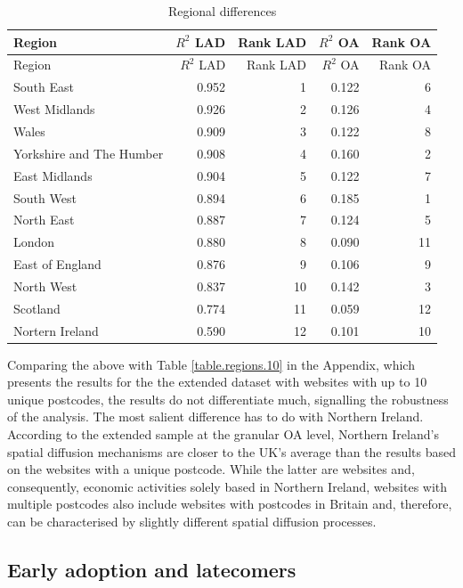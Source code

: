 \documentclass[
  authoryear,
  preprint,
  3p]{elsarticle}
\begin{document}
\begin{longtable}[]{@{}lrrrr@{}}
\caption{Regional differences\label{table.regions}}\tabularnewline
\toprule\noalign{}
Region & \(R^2\) LAD & Rank LAD & \(R^2\) OA & Rank OA \\
\midrule\noalign{}
\endfirsthead
\toprule\noalign{}
Region & \(R^2\) LAD & Rank LAD & \(R^2\) OA & Rank OA \\
\midrule\noalign{}
\endhead
\bottomrule\noalign{}
\endlastfoot
South East & 0.952 & 1 & 0.122 & 6 \\
West Midlands & 0.926 & 2 & 0.126 & 4 \\
Wales & 0.909 & 3 & 0.122 & 8 \\
Yorkshire and The Humber & 0.908 & 4 & 0.160 & 2 \\
East Midlands & 0.904 & 5 & 0.122 & 7 \\
South West & 0.894 & 6 & 0.185 & 1 \\
North East & 0.887 & 7 & 0.124 & 5 \\
London & 0.880 & 8 & 0.090 & 11 \\
East of England & 0.876 & 9 & 0.106 & 9 \\
North West & 0.837 & 10 & 0.142 & 3 \\
Scotland & 0.774 & 11 & 0.059 & 12 \\
Nortern Ireland & 0.590 & 12 & 0.101 & 10 \\
\end{longtable}

Comparing the above with Table \ref{table.regions.10} in the Appendix,
which presents the results for the the extended dataset with websites
with up to 10 unique postcodes, the results do not differentiate much,
signalling the robustness of the analysis. The most salient difference
has to do with Northern Ireland. According to the extended sample at the
granular OA level, Northern Ireland's spatial diffusion mechanisms are
closer to the UK's average than the results based on the websites with a
unique postcode. While the latter are websites and, consequently,
economic activities solely based in Northern Ireland, websites with
multiple postcodes also include websites with postcodes in Britain and,
therefore, can be characterised by slightly different spatial diffusion
processes.

\subsection{Early adoption and
latecomers}\label{early-adoption-and-latecomers}
\end{document}
